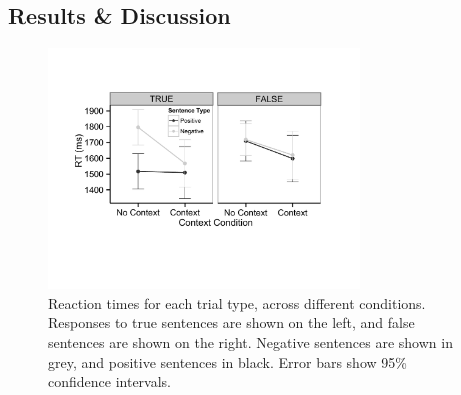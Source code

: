 \documentclass[10pt,letterpaper]{article}
\begin{document}
\subsection{Results \& Discussion}


\begin{figure}
\begin{center} 
\includegraphics[width=3.25in]{figures/study1_linegraph.pdf}
\caption{\label{fig:e1line}Reaction times for each trial type, across different conditions.  Responses to true sentences are shown on the left, and false sentences are shown on the right.  Negative sentences are shown in grey, and positive sentences in black.  Error bars show 95\% confidence intervals.}
\end{center} 
\end{figure}
\end{document}
